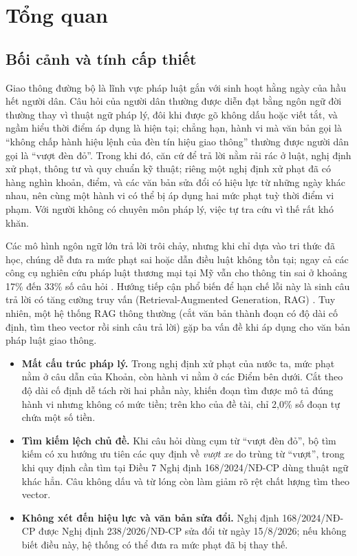 \chapter{Tổng quan}
\label{chap:tong_quan}

\section{Bối cảnh và tính cấp thiết}
\label{sec:c1_boi_canh}

Giao thông đường bộ là lĩnh vực pháp luật gắn với sinh hoạt hằng ngày của hầu hết người dân. Câu hỏi của người dân thường được diễn đạt bằng ngôn ngữ đời thường thay vì thuật ngữ pháp lý, đôi khi được gõ không dấu hoặc viết tắt, và ngầm hiểu thời điểm áp dụng là hiện tại; chẳng hạn, hành vi mà văn bản gọi là ``không chấp hành hiệu lệnh của đèn tín hiệu giao thông'' thường được người dân gọi là ``vượt đèn đỏ''. Trong khi đó, căn cứ để trả lời nằm rải rác ở luật, nghị định xử phạt, thông tư và quy chuẩn kỹ thuật; riêng một nghị định xử phạt đã có hàng nghìn khoản, điểm, và các văn bản sửa đổi có hiệu lực từ những ngày khác nhau, nên cùng một hành vi có thể bị áp dụng hai mức phạt tuỳ thời điểm vi phạm. Với người không có chuyên môn pháp lý, việc tự tra cứu vì thế rất khó khăn.

Các mô hình ngôn ngữ lớn trả lời trôi chảy, nhưng khi chỉ dựa vào tri thức đã học, chúng dễ đưa ra mức phạt sai hoặc dẫn điều luật không tồn tại; ngay cả các công cụ nghiên cứu pháp luật thương mại tại Mỹ vẫn cho thông tin sai ở khoảng 17\% đến 33\% số câu hỏi \cite{magesh2025hallucination}. Hướng tiếp cận phổ biến để hạn chế lỗi này là sinh câu trả lời có tăng cường truy vấn (Retrieval-Augmented Generation, RAG) \cite{lewis2020rag,gao2023ragsurvey}. Tuy nhiên, một hệ thống RAG thông thường (cắt văn bản thành đoạn có độ dài cố định, tìm theo vector rồi sinh câu trả lời) gặp ba vấn đề khi áp dụng cho văn bản pháp luật giao thông.

\begin{itemize}
    \item \textbf{Mất cấu trúc pháp lý.} Trong nghị định xử phạt của nước ta, mức phạt nằm ở câu dẫn của Khoản, còn hành vi nằm ở các Điểm bên dưới. Cắt theo độ dài cố định dễ tách rời hai phần này, khiến đoạn tìm được mô tả đúng hành vi nhưng không có mức tiền; trên kho của đề tài, chỉ 2,0\% số đoạn tự chứa một số tiền.
    \item \textbf{Tìm kiếm lệch chủ đề.} Khi câu hỏi dùng cụm từ ``vượt đèn đỏ'', bộ tìm kiếm có xu hướng ưu tiên các quy định về \emph{vượt xe} do trùng từ ``vượt'', trong khi quy định cần tìm tại Điều 7 Nghị định 168/2024/NĐ-CP dùng thuật ngữ khác hẳn. Câu không dấu và từ lóng còn làm giảm rõ rệt chất lượng tìm theo vector.
    \item \textbf{Không xét đến hiệu lực và văn bản sửa đổi.} Nghị định 168/2024/NĐ-CP được Nghị định 238/2026/NĐ-CP sửa đổi từ ngày 15/8/2026; nếu không biết điều này, hệ thống có thể đưa ra mức phạt đã bị thay thế.
\end{itemize}

